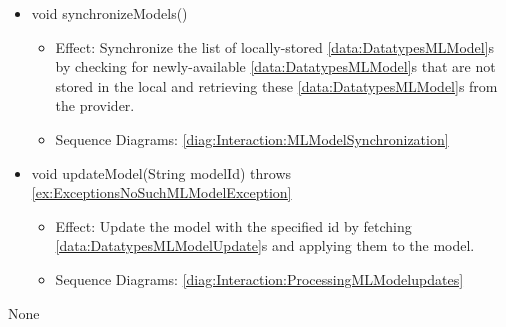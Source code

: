 \begin{description}
\begin{itemize}[noitemsep,nolistsep,leftmargin=-.25cm]
      \item \textsf{void synchronizeModels()}
        \begin{itemize}[noitemsep,nolistsep]
           \item Effect: Synchronize the list of locally-stored \ref{data:DatatypesMLModel}s by checking for newly-available \ref{data:DatatypesMLModel}s that are not stored in the local  and retrieving these \ref{data:DatatypesMLModel}s from the  provider. 
           \item Sequence Diagrams: \cref{diag:Interaction:MLModelSynchronization}
        \end{itemize}
      \item \textsf{void updateModel(String modelId) throws \ref{ex:ExceptionsNoSuchMLModelException}}
        \begin{itemize}[noitemsep,nolistsep]
           \item Effect: Update the model with the specified id by fetching \ref{data:DatatypesMLModelUpdate}s and applying them to the model. 
           \item Sequence Diagrams: \cref{diag:Interaction:ProcessingMLModelupdates}
        \end{itemize}
    \end{itemize}
      \item[Diagrams:] None
    \end{description}

